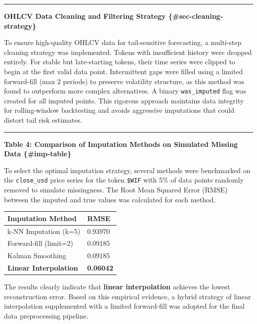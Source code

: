 \documentclass[
  a4paper,
  DIV=11,
  numbers=noendperiod]{scrreprt}
\begin{document}
\begin{center}\rule{0.5\linewidth}{0.5pt}\end{center}

\textbf{OHLCV Data Cleaning and Filtering Strategy
\{\#sec-cleaning-strategy\}}

To ensure high-quality OHLCV data for tail-sensitive forecasting, a
multi-step cleaning strategy was implemented. Tokens with insufficient
history were dropped entirely. For stable but late-starting tokens,
their time series were clipped to begin at the first valid data point.
Intermittent gaps were filled using a limited forward-fill (max 2
periods) to preserve volatility structure, as this method was found to
outperform more complex alternatives. A binary \texttt{was\_imputed}
flag was created for all imputed points. This rigorous approach
maintains data integrity for rolling-window backtesting and avoids
aggressive imputations that could distort tail risk estimates.

\begin{center}\rule{0.5\linewidth}{0.5pt}\end{center}

\textbf{Table 4: Comparison of Imputation Methods on Simulated Missing
Data \{\#imp-table\}}

To select the optimal imputation strategy, several methods were
benchmarked on the \texttt{close\_usd} price series for the token
\texttt{\$WIF} with 5\% of data points randomly removed to simulate
missingness. The Root Mean Squared Error (RMSE) between the imputed and
true values was calculated for each method.

\begin{longtable}[]{@{}ll@{}}
\toprule\noalign{}
Imputation Method & RMSE \\
\midrule\noalign{}
\endhead
\bottomrule\noalign{}
\endlastfoot
k-NN Imputation (k=5) & 0.93970 \\
Forward-fill (limit=2) & 0.09185 \\
Kalman Smoothing & 0.09185 \\
\textbf{Linear Interpolation} & \textbf{0.06042} \\
\end{longtable}

The results clearly indicate that \textbf{linear interpolation} achieves
the lowest reconstruction error. Based on this empirical evidence, a
hybrid strategy of linear interpolation supplemented with a limited
forward-fill was adopted for the final data preprocessing pipeline.
\end{document}
